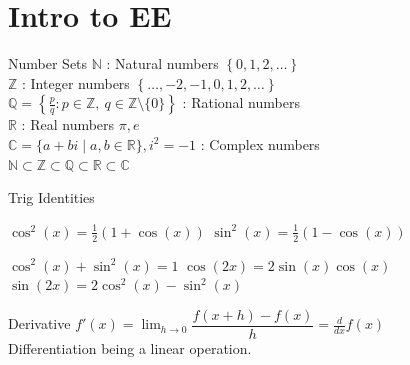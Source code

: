
\section{Intro to EE}

\begin{topic}{Number Sets}
	$\displaystyle \mathbb{N}$ : Natural numbers $\left\{ 0, 1, 2, \dots \right\}$ \\ 
	$\displaystyle \mathbb{Z}$ : Integer numbers $\left\{ \dots, -2, -1, 0, 1, 2, \dots \right\}$ \\ 
	$\displaystyle \mathbb{Q} = \left\{ \frac{p}{q} : p \in \mathbb{Z},\ q \in \mathbb{Z}\setminus\{0\} \right\} $ : Rational numbers \\
	$\displaystyle \mathbb{R}$ : Real numbers $\pi, e$ \\
	$\mathbb{C} = \{ a + bi \mid a, b \in \mathbb{R} \}, i^2 = -1$ : Complex numbers \\ 

	$\mathbb{N} \subset \mathbb{Z} \subset \mathbb{Q} \subset \mathbb{R} \subset \mathbb{C}$

\end{topic}

\begin{topic}{Trig Identities}
	\begin{minipage}{0.45\textwidth}
		\raggedright
		$\displaystyle \cos^2(x) = \frac12 (1 + \cos(x)) $
		$\displaystyle \sin^2(x) = \frac12 (1 - \cos(x)) $
	\end{minipage}
	\begin{minipage}{0.5\textwidth}
		\raggedright
		$\displaystyle \cos^2(x) + \sin^2(x) = 1$
		$\displaystyle \cos(2x) = 2 \sin(x)\cos(x)$
		$\displaystyle \sin(2x) = 2 \cos^2(x) - \sin^2(x)$
	\end{minipage}
\end{topic}

\begin{topic}{Derivative}
	$\displaystyle f'(x) = \lim_{h \to 0} \dfrac{f(x+h) - f(x)}{h} = \frac{d}{dx}f(x)$ \\
	Differentiation being a linear operation.
\end{topic}

